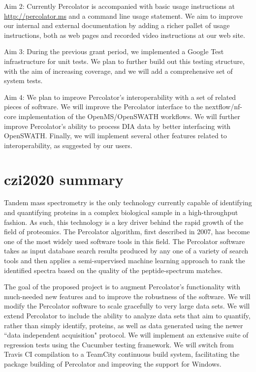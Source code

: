 \documentclass{article}
\begin{document}
Aim 2: Currently Percolator is accompanied with basic usage
instructions at \url{http://percolator.ms} and a command line usage
statement. We aim to improve our internal and external documentation
by adding a richer pallet of usage instructions, both as web pages and
recorded video instructions at our web site.

Aim 3: During the previous grant period, we implemented a Google Test
infrastructure for unit tests. We plan to further build out this
testing structure, with the aim of increasing coverage, and we will add
a comprehensive set of system tests.

Aim 4: We plan to improve Percolator's interoperability with a set of
related pieces of software. We will improve the Percolator interface
to the nextflow/nf-core implementation of the OpenMS/OpenSWATH
workflows.  We will further improve Percolator's ability to process
DIA data by better interfacing with OpenSWATH.  Finally, we will
implement several other features related to interoperability, as
suggested by our users.

\section*{czi2020 summary}
Tandem mass spectrometry is the only technology currently capable of
identifying and quantifying proteins in a complex biological sample in
a high-throughput fashion. As such, this technology is a key driver
behind the rapid growth of the field of proteomics.  The Percolator
algorithm, first described in 2007, has become one of the most widely
used software tools in this field.  The Percolator software takes as
input database search results produced by any one of a variety of
search tools and then applies a semi-supervised machine learning
approach to rank the identified spectra based on the quality of the
peptide-spectrum matches.

The goal of the proposed project is to augment Percolator's
functionality with much-needed new features and to improve the
robustness of the software.
We will modify the Percolator software to scale gracefully to very
large data sets.
We will extend Percolator to include the ability to analyze data
sets that aim to quantify, rather than simply identify, proteins, as
well as data generated using the newer ``data independent acquisition"
protocol.
We will implement an extensive suite of regression tests using the
Cucumber testing framework.
We will switch from Travis CI compilation to a TeamCity continuous
build system, facilitating the package building of Percolator and improving the support for Windows.
\end{document}
